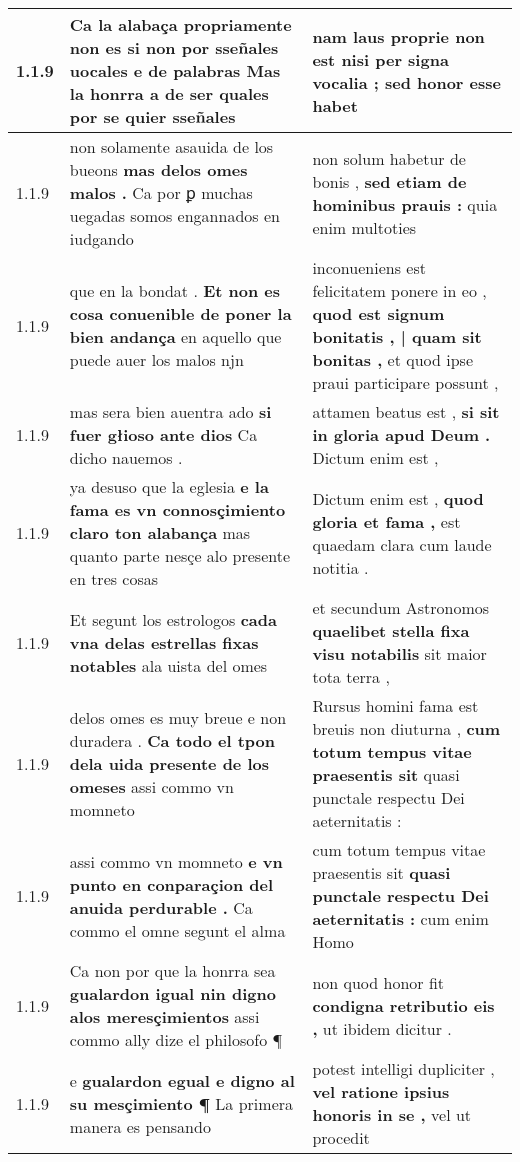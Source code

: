 \begin{tabular}{|p{1cm}|p{6.5cm}|p{6.5cm}|}
1.1.9 & Ca la alabaça propriamente non es si non \textbf{ por sseñales uocales e de palabras } Mas la honrra a de ser quales por se quier sseñales & nam laus proprie non est \textbf{ nisi per signa vocalia ; } sed honor esse habet \\\hline
1.1.9 & non solamente asauida de los bueons \textbf{ mas delos omes malos . } Ca por ꝑ muchas uegadas somos engannados en iudgando & non solum habetur de bonis , \textbf{ sed etiam de hominibus prauis : } quia enim multoties \\\hline
1.1.9 & que en la bondat . \textbf{ Et non es cosa conuenible de poner la bien andança } en aquello que puede auer los malos njn & inconueniens est felicitatem ponere in eo , \textbf{ quod est signum bonitatis , | quam sit bonitas , } et quod ipse praui participare possunt , \\\hline
1.1.9 & mas sera bien auentra ado \textbf{ si fuer głioso ante dios } Ca dicho nauemos . & attamen beatus est , \textbf{ si sit in gloria apud Deum . } Dictum enim est , \\\hline
1.1.9 & ya desuso que la eglesia \textbf{ e la fama es vn connosçimiento claro ton alabança } mas quanto parte nesçe alo presente en tres cosas & Dictum enim est , \textbf{ quod gloria et fama , } est quaedam clara cum laude notitia . \\\hline
1.1.9 & Et segunt los estrologos \textbf{ cada vna delas estrellas fixas notables } ala uista del omes & et secundum Astronomos \textbf{ quaelibet stella fixa visu notabilis } sit maior tota terra , \\\hline
1.1.9 & delos omes es muy breue e non duradera . \textbf{ Ca todo el tpon dela uida presente de los omeses } assi commo vn momneto & Rursus homini fama est breuis non diuturna , \textbf{ cum totum tempus vitae praesentis sit } quasi punctale respectu Dei aeternitatis : \\\hline
1.1.9 & assi commo vn momneto \textbf{ e vn punto en conparaçion del anuida perdurable . } Ca commo el omne segunt el alma & cum totum tempus vitae praesentis sit \textbf{ quasi punctale respectu Dei aeternitatis : } cum enim Homo \\\hline
1.1.9 & Ca non por que la honrra sea \textbf{ gualardon igual nin digno alos meresçimientos } assi commo ally dize el philosofo ¶ & non quod honor fit \textbf{ condigna retributio eis , } ut ibidem dicitur . \\\hline
1.1.9 & e \textbf{ gualardon egual e digno al su mesçimiento ¶ } La primera manera es pensando & potest intelligi dupliciter , \textbf{ vel ratione ipsius honoris in se , } vel ut procedit \\\hline

\end{tabular}
